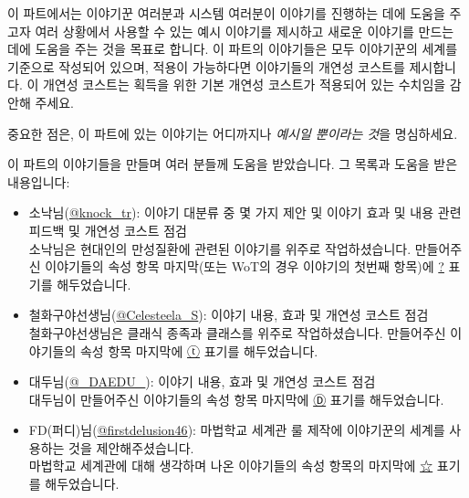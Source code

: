 \documentclass{report}
\begin{document}
	이 파트에서는 이야기꾼 여러분과 시스템 여러분이 이야기를 진행하는 데에 도움을 주고자 여러 상황에서 사용할 수 있는 예시 이야기를 제시하고 새로운 이야기를 만드는 데에 도움을 주는 것을 목표로 합니다. 이 파트의 이야기들은 모두 이야기꾼의 세계를 기준으로 작성되어 있으며, 적용이 가능하다면 이야기들의 개연성 코스트를 제시합니다. 이 개연성 코스트는 획득을 위한 기본 개연성 코스트가 적용되어 있는 수치임을 감안해 주세요.
	
	중요한 점은, 이 파트에 있는 이야기는 어디까지나 \emph{예시일 뿐이라는 것}을 명심하세요.
	
	이 파트의 이야기들을 만들며 여러 분들께 도움을 받았습니다. 그 목록과 도움을 받은 내용입니다:
	\begin{itemize}
		\item \hypertarget{knock}{}소낙님(\href{https://twitter.com/knock_tr}{@knock\_tr}): 이야기 대분류 중 몇 가지 제안 및 이야기 효과 및 내용 관련 피드백 및 개연성 코스트 점검\\
		소낙님은 현대인의 만성질환에 관련된 이야기를 위주로 작업하셨습니다. 만들어주신 이야기들의 속성 항목 마지막(또는 WoT의 경우 이야기의 첫번째 항목)에 \hyperlink{knock}{?} 표기를 해두었습니다.
		
		\item \hypertarget{celesteela}{}철화구야선생님(\href{https://twitter.com/Celesteela_S}{@Celesteela\_S}): 이야기 내용, 효과 및 개연성 코스트 점검\\
		철화구야선생님은 클래식 종족과 클래스를 위주로 작업하셨습니다. 만들어주신 이야기들의 속성 항목 마지막에 \hyperlink{celesteela}{ⓣ} 표기를 해두었습니다.
		
		\item \hypertarget{daedu}{}대두님(\href{https://twitter.com/_DAEDU_}{@\_DAEDU\_}): 이야기 내용, 효과 및 개연성 코스트 점검\\
		대두님이 만들어주신 이야기들의 속성 항목 마지막에 \hyperlink{daedu}{Ⓓ}  표기를 해두었습니다.
		
		\item \hypertarget{fd46}{}FD(퍼디)님(\href{https://twitter.com/firstdelusion46}{@firstdelusion46}): 마법학교 세계관 룰 제작에 이야기꾼의 세계를 사용하는 것을 제안해주셨습니다.\\
		마법학교 세계관에 대해 생각하며 나온 이야기들의 속성 항목의 마지막에 \hyperlink{fd46}{☆} 표기를 해두었습니다.
	\end{itemize}
\end{document}
